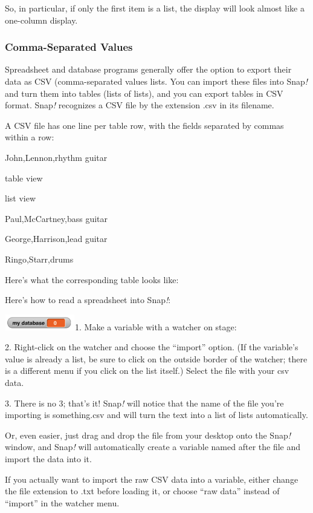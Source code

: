 So, in particular, if only the first item is a list, the display will
look almost like a one-column display.

\subsubsection{Comma-Separated Values}\label{comma-separated-values}

Spreadsheet and database programs generally offer the option to export
their data as CSV (comma-separated values lists. You can import these
files into Snap\emph{!} and turn them into tables (lists of lists), and
you can export tables in CSV format. Snap\emph{!} recognizes a CSV file
by the extension .csv in its filename.

A CSV file has one line per table row, with the fields separated by
commas within a row:

John,Lennon,rhythm guitar

table view

list view

Paul,McCartney,bass guitar

George,Harrison,lead guitar

Ringo,Starr,drums

Here's what the corresponding table looks like:

Here's how to read a spreadsheet into Snap\emph{!}:

\includegraphics[width=1.20833in,height=0.27083in]{media/image607.png}1.
Make a variable with a watcher on stage:

2. Right-click on the watcher and choose the ``import'' option. (If the
variable's value is already a list, be sure to click on the outside
border of the watcher; there is a different menu if you click on the
list itself.) Select the file with your csv data.

3. There is no 3; that's it! Snap\emph{!} will notice that the name of
the file you're importing is something.csv and will turn the text into a
list of lists automatically.

Or, even easier, just drag and drop the file from your desktop onto the
Snap\emph{!} window, and Snap\emph{!} will automatically create a
variable named after the file and import the data into it.

If you actually want to import the raw CSV data into a variable, either
change the file extension to .txt before loading it, or choose ``raw
data'' instead of ``import'' in the watcher menu.

